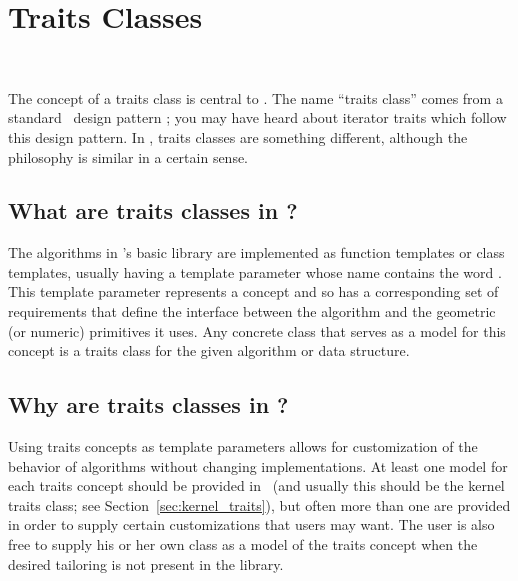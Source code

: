 
\chapter{Traits Classes}
\label{chap:traits_classes}
 \\

The concept of a traits class is central to \cgal. The name ``traits
class'' comes from a standard \CC\ design pattern
\cite{cgal:m-tnutt-95}; you may have heard about iterator traits which
follow this design pattern. In \cgal, traits classes are something
different, although the philosophy is similar in a certain sense.

\section{What are traits classes in \cgal?} 
\label{sec:what_is_a_traits_class}

The algorithms in \cgal's basic library are implemented as function templates
or class templates, usually having a template parameter whose name contains
the word .  This template parameter 
represents a concept and so has a corresponding set of requirements that
define the interface between the algorithm and the geometric (or numeric) 
primitives it uses.  Any concrete class that serves as a model for this 
concept is a traits class for the given algorithm or data structure.

\section{Why are traits classes in \cgal?}
\label{sec:why_traits_classes}

Using traits concepts as template parameters allows for customization of 
the behavior of algorithms without changing implementations.
At least one model for each traits concept should be provided in
\cgal\ (and usually this should be the kernel traits class; see 
Section~\ref{sec:kernel_traits}), but often more than one are provided
in order to supply certain customizations that users may want.  The user 
is also free to supply his or her own class as a model of the traits
concept when the desired tailoring is not present in the library.

